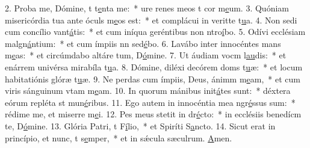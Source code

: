 2. Proba me, Dómine, t t\uline{e}nta me:~* ure renes meos t cor m\uline{e}um.
3. Quóniam misericórdia tua ante óculs m\uline{e}os est:~* et complácui in veritte t\uline{u}a.
4. Non sedi cum concílio vant\uline{á}tis:~* et cum iníqua geréntibus non ntro\uline{í}bo.
5. Odívi ecclésiam malgn\uline{á}ntium:~* et cum ímpiis nn sed\uline{é}bo.
6. Lavábo inter innocéntes mans m\uline{e}as:~* et circúmdabo altáre tum, D\uline{ó}mine.
7. Ut áudiam vocm l\uline{au}dis:~* et enárrem univérsa mirabíla t\uline{u}a.
8. Dómine, diléxi decórem doms t\uline{u}æ:~* et locum habitatiónis glóræ t\uline{u}æ.
9. Ne perdas cum ímpiis, Deus, ánimm m\uline{e}am,~* et cum viris sánguinum vtam m\uline{e}am.
10. In quorum mánibus init\uline{á}tes sunt:~* déxtera eórum repléta st mun\uline{é}ribus.
11. Ego autem in innocéntia mea ngr\uline{é}ssus sum:~* rédime me, et miserre m\uline{e}i.
12. Pes meus stetit in dr\uline{é}cto:~* in ecclésiis benedícm te, D\uline{ó}mine.
13. Glória Patri, t F\uline{í}lio,~* et Spiríti S\uline{a}ncto.
14. Sicut erat in princípio, et nunc, t s\uline{e}mper,~* et in sǽcula sæculrum. \uline{A}men.
